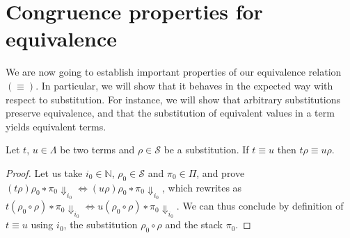 \section{Congruence properties for equivalence}

We are now going to establish important properties of our equivalence
relation $(≡)$. In particular, we will show that it behaves in the expected
way with respect to substitution. For instance, we will show that arbitrary
substitutions preserve equivalence, and that the substitution of equivalent
values in a term yields equivalent terms.

\begin{theorem}[substitutivity]\label{fullsubstequiv}%
  Let $t$, $u ∈ Λ$ be two terms and $ρ ∈ \mathcal{S}$ be a substitution. If
  $t ≡ u$ then $tρ ≡ uρ$.
\end{theorem}
\begin{proof}
  Let us take $i_0 ∈ \mathbb{N}$, $ρ_0 ∈ \mathcal{S}$ and $π_0 ∈ Π$, and prove
  ${{(tρ)ρ_0 ∗ π_0} {⇓}_{i_0}} ⇔ {{(uρ)ρ_0 ∗ π_0} {⇓}_{i_0}}$, which rewrites
  as ${{t(ρ_0 ∘ ρ) ∗ π_0} {⇓}_{i_0}} ⇔ {{u(ρ_0 ∘ ρ) ∗ π_0} {⇓}_{i_0}}$. We can
  thus conclude by definition of $t ≡ u$ using $i_0$, the substitution
  $ρ_0 ∘ ρ$ and the stack $π_0$.
\end{proof}


